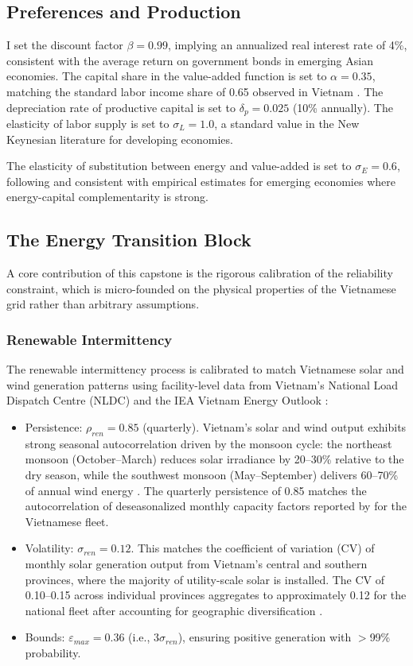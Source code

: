 \documentclass[12pt, a4paper]{article}
\begin{document}
\subsection{Preferences and Production}
I set the discount factor $\beta = 0.99$, implying an annualized real interest rate of 4\%, consistent with the average return on government bonds in emerging Asian economies. The capital share in the value-added function is set to $\alpha = 0.35$, matching the standard labor income share of 0.65 observed in Vietnam \citep{gso2024}. The depreciation rate of productive capital is set to $\delta_p = 0.025$ (10\% annually). The elasticity of labor supply is set to $\sigma_L = 1.0$, a standard value in the New Keynesian literature for developing economies.

The elasticity of substitution between energy and value-added is set to $\sigma_E = 0.6$, following \citet{heutel2012} and consistent with empirical estimates for emerging economies where energy-capital complementarity is strong.

\subsection{The Energy Transition Block}

A core contribution of this capstone is the rigorous calibration of the reliability constraint, which is micro-founded on the physical properties of the Vietnamese grid rather than arbitrary assumptions.

\subsubsection{Renewable Intermittency}

The renewable intermittency process is calibrated to match Vietnamese solar and wind generation patterns using facility-level data from Vietnam's National Load Dispatch Centre (NLDC) and the IEA Vietnam Energy Outlook \citep{iea2023}:

\begin{itemize}
    \item Persistence: $\rho_{ren} = 0.85$ (quarterly). Vietnam's solar and wind output exhibits strong seasonal autocorrelation driven by the monsoon cycle: the northeast monsoon (October--March) reduces solar irradiance by 20--30\% relative to the dry season, while the southwest monsoon (May--September) delivers 60--70\% of annual wind energy \citep{nguyenle2019}. The quarterly persistence of 0.85 matches the autocorrelation of deseasonalized monthly capacity factors reported by \citet{iea2023} for the Vietnamese fleet.
    \item Volatility: $\sigma_{ren} = 0.12$. This matches the coefficient of variation (CV) of monthly solar generation output from Vietnam's central and southern provinces, where the majority of utility-scale solar is installed. The CV of 0.10--0.15 across individual provinces aggregates to approximately 0.12 for the national fleet after accounting for geographic diversification \citep{gso2024}.
    \item Bounds: $\varepsilon_{max} = 0.36$ (i.e., $3\sigma_{ren}$), ensuring positive generation with $>$99\% probability.
\end{itemize}
\end{document}
